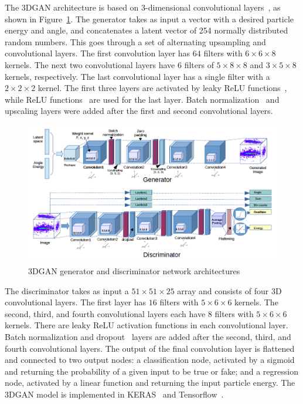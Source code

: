 The 3DGAN architecture is based on 3-dimensional convolutional layers~\cite{conv}, as shown in Figure~\ref{fig:GAN_arch}. The generator takes as input a vector with a desired particle energy and angle, and concatenates a latent vector of 254 normally distributed random numbers. This goes through a set of alternating upsampling and convolutional layers. The first convolution layer has $64$ filters with $6 \times 6 \times 8$ kernels. The next two convolutional layers have $6$ filters of $5 \times 8 \times 8$ and $3 \times 5 \times 8$ kernels, respectively. The last convolutional layer has a single filter with a $2 \times 2 \times 2$ kernel. The first three layers are activated by leaky ReLU functions~\cite{LeakyReLU}, while ReLU functions~\cite{ReLU} are used for the last layer. Batch normalization~\cite{batchnorm} and upscaling layers were added after the first and second convolutional layers.

\begin{figure}[htbp]
\centering
    \includegraphics[width=\textwidth]{Images/Calo/gan_model_alt_upsampling.png}
    \caption{3DGAN generator and discriminator network architectures}
    \label{fig:GAN_arch}
\end{figure}

The discriminator takes as input a $51  \times 51  \times 25$ array and consists of four 3D convolutional layers. The first layer has $16$ filters with $5 \times 6 \times 6$ kernels. The second, third, and fourth convolutional layers each have $8$ filters with $5 \times 6 \times 6$ kernels. There are leaky ReLU activation functions in each convolutional layer. Batch normalization and dropout~\cite{dropout} layers are added after the second, third, and fourth convolutional layers. The output of the final convolution layer is flattened and connected to two output nodes: a classification node, activated by a sigmoid and returning the probability of a given input to be true or fake; and a regression node, activated by a linear function and returning the input particle energy.
The 3DGAN model is implemented in KERAS~\cite{keras} and Tensorflow~\cite{tensorflow2015-whitepaper}.

